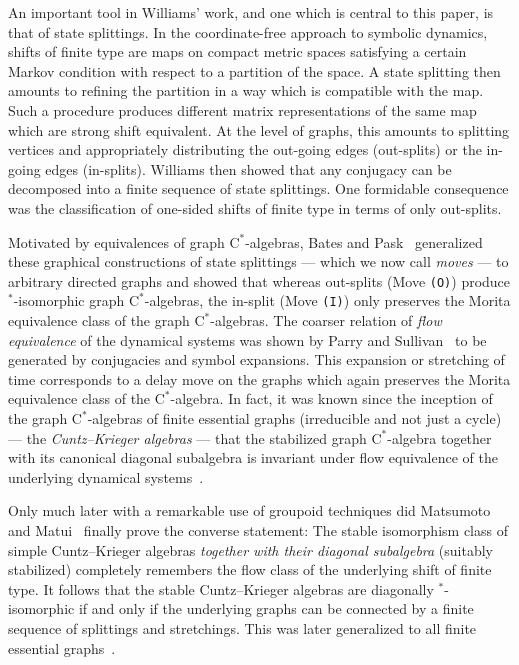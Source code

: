 \documentclass[12pt,a4paper,oneside,reqno,final]{amsart}
\theoremstyle{definition}
\numberwithin{equation}{section} %
\begin{document}
An important tool in Williams' work, and one which is central to this paper, is that of state splittings.
In the coordinate-free approach to symbolic dynamics, shifts of finite type are maps on compact metric spaces satisfying a certain Markov condition with respect to a partition of the space.
A state splitting then amounts to refining the partition in a way which is compatible with the map.
Such a procedure produces different matrix representations of the same map which are strong shift equivalent.
At the level of graphs, this amounts to splitting vertices and appropriately distributing the out-going edges (out-splits) or the in-going edges (in-splits).
Williams then showed that any conjugacy can be decomposed into a finite sequence of state splittings.
One formidable consequence was the classification of one-sided shifts of finite type in terms of only out-splits.


Motivated by equivalences of graph $\mathrm{C^*}$-algebras, Bates and Pask~\cite{Bates-Pask2004} generalized these graphical constructions of state splittings
--- which we now call \emph{moves} --- 
to arbitrary directed graphs and showed that whereas out-splits (Move \texttt{(O)}) produce $^*$-isomorphic graph $\mathrm{C^*}$-algebras,
the in-split (Move \texttt{(I)}) only preserves the Morita equivalence class of the graph $\mathrm{C^*}$-algebras.
The coarser relation of \emph{flow equivalence} of the dynamical systems was shown by Parry and Sullivan~\cite{Parry-Sullivan} to be generated by conjugacies and symbol expansions.
This expansion or stretching of time corresponds to a delay move on the graphs which again preserves the Morita equivalence class of the $\mathrm{C^*}$-algebra.
In fact, it was known since the inception of the graph $\mathrm{C^*}$-algebras of finite essential graphs (irreducible and not just a cycle) 
--- the \emph{Cuntz--Krieger algebras} ---
that the stabilized graph $\mathrm{C^*}$-algebra together with its canonical diagonal subalgebra is invariant under flow equivalence of the underlying dynamical systems~\cite{CK80}.

Only much later with a remarkable use of groupoid techniques did Matsumoto and Matui~\cite{MM14} finally prove the converse statement: 
The stable isomorphism class of simple Cuntz--Krieger algebras \emph{together with their diagonal subalgebra} (suitably stabilized)
completely remembers the flow class of the underlying shift of finite type.
It follows that the stable Cuntz--Krieger algebras are diagonally $^*$-isomorphic if and only if the underlying graphs can be connected by a finite sequence of splittings and stretchings.
This was later generalized to all finite essential graphs~\cite{CEOR}.
\end{document}
